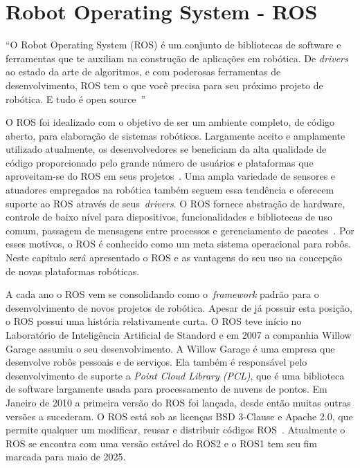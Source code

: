 \chapter{Robot Operating System - ROS}\label{cap:ros}

\begin{citacao}
``O Robot Operating System (ROS) é um conjunto de bibliotecas de software e ferramentas que te auxiliam na construção de aplicações em robótica. De \textit{drivers} ao estado da arte de algoritmos, e com poderosas ferramentas de desenvolvimento, ROS tem o que você precisa para seu próximo projeto de robótica. E tudo é open source~\cite{Ros}''    
\end{citacao}

O ROS foi idealizado com o objetivo de ser um ambiente completo, de código aberto, para elaboração de sistemas robóticos. Largamente aceito e amplamente utilizado atualmente, os desenvolvedores se beneficiam da alta qualidade de código proporcionado pelo grande número de usuários e plataformas que aproveitam-se do ROS em seus projetos~\cite{RosIntro}. Uma ampla variedade de sensores e atuadores empregados na robótica também seguem essa tendência e oferecem suporte ao ROS através de seus~\textit{drivers}. O ROS fornece abstração de hardware, controle de baixo nível para dispositivos, funcionalidades e bibliotecas de uso comum, passagem de mensagens entre processos e gerenciamento de pacotes~\cite{rosEfetiveProgram}. Por esses motivos, o ROS é conhecido como um meta sistema operacional para robôs. Neste capítulo será apresentado o ROS e as vantagens do seu uso na concepção de novas plataformas robóticas.

A cada ano o ROS vem se consolidando como o~\textit{framework} padrão para o desenvolvimento de novos projetos de robótica. Apesar de já possuir esta posição, o ROS possui uma história relativamente curta. O ROS teve início no Laboratório de Inteligência Artificial de Standord e em 2007 a companhia Willow Garage assumiu o seu desenvolvimento. A Willow Garage é uma empresa que desenvolve robôs pessoais e de serviços. Ela também é responsável pelo desenvolvimento de suporte a \textit{Point Cloud Library (PCL)}, que é uma biblioteca de software largamente usada para processamento de nuvens de pontos. Em Janeiro de 2010 a primeira versão do ROS foi lançada, desde então muitas outras versões a sucederam. O ROS está sob as licenças BSD 3-Clause e Apache 2.0, que permite qualquer um modificar, reusar e distribuir códigos ROS~\cite{rosPYO}. Atualmente o ROS se encontra com uma versão estável do ROS2 e o ROS1 tem seu fim marcada para maio de 2025.


